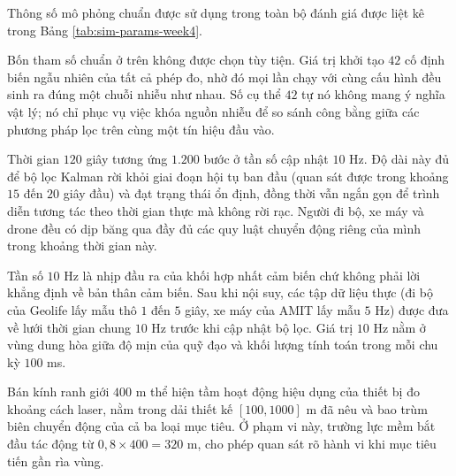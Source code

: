 Thông số mô phỏng chuẩn được sử dụng trong toàn bộ đánh giá được liệt kê trong Bảng \ref{tab:sim-params-week4}.

\begin{table}[H]
\centering
\caption{Thông số mô phỏng chuẩn}
\label{tab:sim-params-week4}
\end{table}

Bốn tham số chuẩn ở trên không được chọn tùy tiện. Giá trị khởi tạo $42$ cố định biến ngẫu nhiên của tất cả phép đo, nhờ đó mọi lần chạy với cùng cấu hình đều sinh ra đúng một chuỗi nhiễu như nhau. Số cụ thể $42$ tự nó không mang ý nghĩa vật lý; nó chỉ phục vụ việc khóa nguồn nhiễu để so sánh công bằng giữa các phương pháp lọc trên cùng một tín hiệu đầu vào.

Thời gian $120$ giây tương ứng $1.200$ bước ở tần số cập nhật $10$ Hz. Độ dài này đủ để bộ lọc Kalman rời khỏi giai đoạn hội tụ ban đầu (quan sát được trong khoảng $15$ đến $20$ giây đầu) và đạt trạng thái ổn định, đồng thời vẫn ngắn gọn để trình diễn tương tác theo thời gian thực mà không rời rạc. Người đi bộ, xe máy và drone đều có dịp băng qua đầy đủ các quy luật chuyển động riêng của mình trong khoảng thời gian này.

Tần số $10$ Hz là nhịp đầu ra của khối hợp nhất cảm biến chứ không phải lời khẳng định về bản thân cảm biến. Sau khi nội suy, các tập dữ liệu thực (đi bộ của Geolife lấy mẫu thô $1$ đến $5$ giây, xe máy của AMIT lấy mẫu $5$ Hz) được đưa về lưới thời gian chung $10$ Hz trước khi cập nhật bộ lọc. Giá trị $10$ Hz nằm ở vùng dung hòa giữa độ mịn của quỹ đạo và khối lượng tính toán trong mỗi chu kỳ $100$ ms.

Bán kính ranh giới $400$ m thể hiện tầm hoạt động hiệu dụng của thiết bị đo khoảng cách laser, nằm trong dải thiết kế $[100, 1000]$ m đã nêu và bao trùm biên chuyển động của cả ba loại mục tiêu. Ở phạm vi này, trường lực mềm bắt đầu tác động từ $0{,}8 \times 400 = 320$ m, cho phép quan sát rõ hành vi khi mục tiêu tiến gần rìa vùng.

